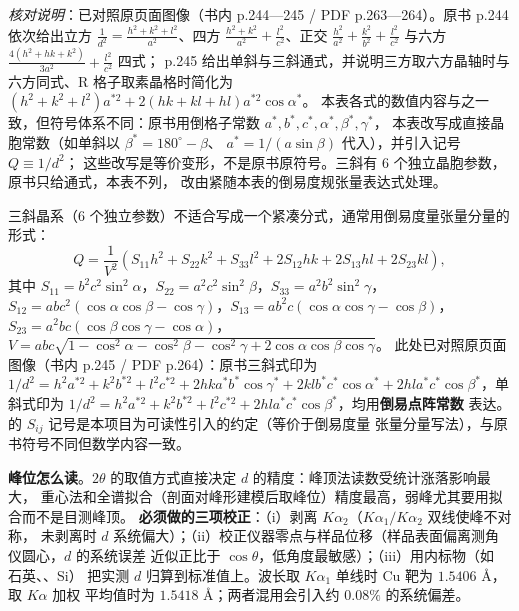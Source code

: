 \emph{核对说明}：已对照原页面图像（书内 p.244—245 / PDF p.263—264）。原书
p.244 依次给出立方
$\frac{1}{d^{2}}=\frac{h^{2}+k^{2}+l^{2}}{a^{2}}$、四方
$\frac{h^{2}+k^{2}}{a^{2}}+\frac{l^{2}}{c^{2}}$、正交
$\frac{h^{2}}{a^{2}}+\frac{k^{2}}{b^{2}}+\frac{l^{2}}{c^{2}}$
与六方
$\frac{4(h^{2}+hk+k^{2})}{3a^{2}}+\frac{l^{2}}{c^{2}}$ 四式；
p.245 给出单斜与三斜通式，并说明三方取六方晶轴时与六方同式、R 格子取素晶格时简化为
$(h^{2}+k^{2}+l^{2})a^{*2}+2(hk+kl+hl)a^{*2}\cos\alpha^{*}$。
本表各式的数值内容与之一致，但符号体系不同：原书用倒格子常数
$a^{*},b^{*},c^{*},\alpha^{*},\beta^{*},\gamma^{*}$，
本表改写成直接晶胞常数（如单斜以 $\beta^{*}=180^{\circ}-\beta$、
$a^{*}=1/(a\sin\beta)$ 代入），并引入记号 $Q\equiv 1/d^{2}$；
这些改写是等价变形，不是原书原符号。三斜有 6 个独立晶胞参数，原书只给通式，本表不列，
改由紧随本表的倒易度规张量表达式处理。


三斜晶系（6 个独立参数）不适合写成一个紧凑分式，通常用倒易度量张量分量的形式：
\begin{equation}
Q=\frac{1}{V^{2}}\left(S_{11}h^{2}+S_{22}k^{2}+S_{33}l^{2}+2S_{12}hk+2S_{13}hl+2S_{23}kl\right),
\label{eq:ch04b-triclinic}
\end{equation}
其中 $S_{11}=b^{2}c^{2}\sin^{2}\alpha$，$S_{22}=a^{2}c^{2}\sin^{2}\beta$，$S_{33}=a^{2}b^{2}\sin^{2}\gamma$，
$S_{12}=abc^{2}(\cos\alpha\cos\beta-\cos\gamma)$，$S_{13}=ab^{2}c(\cos\alpha\cos\gamma-\cos\beta)$，
$S_{23}=a^{2}bc(\cos\beta\cos\gamma-\cos\alpha)$，
$V=abc\sqrt{1-\cos^{2}\alpha-\cos^{2}\beta-\cos^{2}\gamma+2\cos\alpha\cos\beta\cos\gamma}$。
此处已对照原页面图像（书内 p.245 / PDF p.264）：原书三斜式印为
$1/d^{2}=h^{2}a^{*2}+k^{2}b^{*2}+l^{2}c^{*2}+2hka^{*}b^{*}\cos\gamma^{*}+2klb^{*}c^{*}\cos\alpha^{*}
+2hla^{*}c^{*}\cos\beta^{*}$，单斜式印为
$1/d^{2}=h^{2}a^{*2}+k^{2}b^{*2}+l^{2}c^{*2}+2hla^{*}c^{*}\cos\beta^{*}$，均用\textbf{倒易点阵常数}
表达。 的 $S_{ij}$ 记号是本项目为可读性引入的约定（等价于倒易度量
张量分量写法），与原书符号不同但数学内容一致。

\begin{measure}
\textbf{峰位怎么读}。$2\theta$ 的取值方式直接决定 $d$ 的精度：峰顶法读数受统计涨落影响最大，
重心法和全谱拟合（剖面对峰形建模后取峰位）精度最高，弱峰尤其要用拟合而不是目测峰顶。
\textbf{必须做的三项校正}：（i）剥离 $K\alpha_{2}$（$K\alpha_{1}/K\alpha_{2}$ 双线使峰不对称，
未剥离时 $d$ 系统偏大）；（ii）校正仪器零点与样品位移（样品表面偏离测角仪圆心，$d$ 的系统误差
近似正比于 $\cos\theta$，低角度最敏感）；（iii）用内标物（如  石英、、Si）
把实测 $d$ 归算到标准值上。波长取 $K\alpha_{1}$ 单线时 Cu 靶为 $1.5406$ Å，取 $K\alpha$ 加权
平均值时为 $1.5418$ Å；两者混用会引入约 $0.08\%$ 的系统偏差。
\end{measure}

